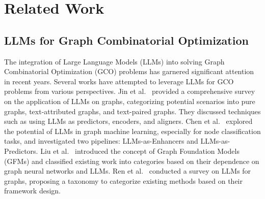 \section{Related Work}
\subsection{LLMs for Graph Combinatorial Optimization}

The integration of Large Language Models (LLMs) into solving Graph Combinatorial Optimization (GCO) problems has garnered significant attention in recent years. Several works have attempted to leverage LLMs for GCO problems from various perspectives. Jin et al.~\cite{jin2024large} provided a comprehensive survey on the application of LLMs on graphs, categorizing potential scenarios into pure graphs, text-attributed graphs, and text-paired graphs. They discussed techniques such as using LLMs as predictors, encoders, and aligners. Chen et al.~\cite{chen2024exploring} explored the potential of LLMs in graph machine learning, especially for node classification tasks, and investigated two pipelines: LLMs-as-Enhancers and LLMs-as-Predictors. Liu et al.~\cite{liu2023towards} introduced the concept of Graph Foundation Models (GFMs) and classified existing work into categories based on their dependence on graph neural networks and LLMs. Ren et al.~\cite{ren2024survey} conducted a survey on LLMs for graphs, proposing a taxonomy to categorize existing methods based on their framework design.

